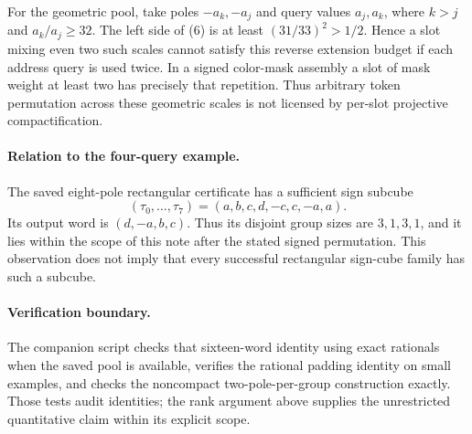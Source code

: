 \documentclass[11pt]{article}
\begin{document}
For the geometric pool, take poles $-a_k,-a_j$ and query values
$a_j,a_k$, where $k>j$ and $a_k/a_j\geq32$. The left side of (6) is
at least $(31/33)^2>1/2$. Hence a slot mixing even two such scales
cannot satisfy this reverse extension budget if each address query
is used twice. In a signed color-mask assembly a slot of mask weight
at least two has precisely that repetition. Thus arbitrary token
permutation across these geometric scales is not licensed by
per-slot projective compactification.

\paragraph{Relation to the four-query example.}
The saved eight-pole rectangular certificate has a sufficient sign
subcube
\[
 (\tau_0,\ldots,\tau_7)=(a,b,c,d,-c,c,-a,a).
\]
Its output word is $(d,-a,b,c)$. Thus its disjoint group sizes are
$3,1,3,1$, and it lies within the scope of this note after the stated
signed permutation. This observation does not imply that every
successful rectangular sign-cube family has such a subcube.

\paragraph{Verification boundary.}
The companion script checks that sixteen-word identity using exact
rationals when the saved pool is available, verifies the rational
padding identity on small examples, and checks the noncompact
two-pole-per-group construction exactly. Those tests audit identities;
the rank argument above supplies the unrestricted quantitative claim
within its explicit scope.
\end{document}
